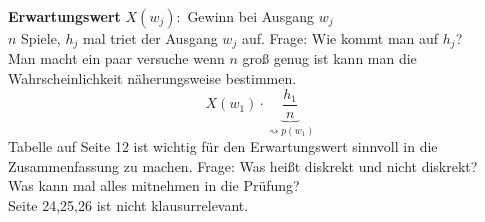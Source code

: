 \textbf{Erwartungswert}
$X(w_j):$ Gewinn bei Ausgang $w_j$\\
$n$ Spiele, $h_j$ mal triet der Ausgang $w_j$ auf.
Frage: Wie kommt man auf $h_j$?\\
Man macht ein paar versuche wenn $n$ groß genug ist kann man die Wahrscheinlichkeit näherungsweise bestimmen.
\[X(w_1)\cdot \underbrace{\frac{h_1}{n}}_{\rightsquigarrow p(w_1)}\]
Tabelle auf Seite 12 ist wichtig für den Erwartungswert sinnvoll in die Zusammenfassung zu machen.
Frage: Was heißt diskrekt und nicht diskrekt?\\
Was kann mal alles mitnehmen in die Prüfung?\\
Seite 24,25,26 ist nicht klausurrelevant.


